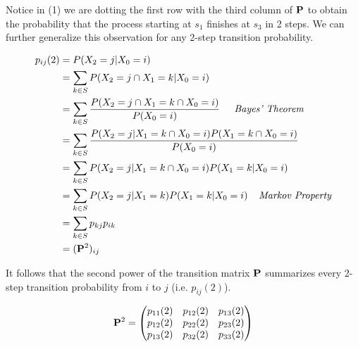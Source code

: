 \documentclass[a4paper,12pt]{article}
\theoremstyle{definition}
\let\oldtextbf\mathbf
\renewcommand{\mathbf}[1]{\oldtextbf{\boldmath #1}}
\begin{document}
	Notice in (1) we are dotting the first row with the third column of $\mathbf{P}$ to obtain the probability 
	that the process starting at $s_1$ finishes at $s_3$ in 2 steps. We can further generalize this observation for any 2-step 
	transition probability.

	\begin{equation*}
		\begin{aligned}
			p_{ij}(2) &= P(X_{2} = j | X_0 = i) \\
					&= \sum_{k \in S} P(X_{2} = j \cap X_1 = k | X_0 = i) \\
					&= \sum_{k \in S} \frac{P(X_{2} = j \cap X_1 = k \cap X_0 = i)}{P(X_0 = i)}\ \;\;\;\; \emph{Bayes' Theorem} \\
					&= \sum_{k \in S} \frac{P(X_{2} = j | X_1 = k \cap X_0 = i)P(X_1 = k \cap X_0 = i)}{P(X_0 = i)}\ \\
					&= \sum_{k \in S} P(X_{2} = j | X_1 = k \cap X_0 = i)P(X_1 = k | X_0 = i) \\
					&= \sum_{k \in S} P(X_{2} = j | X_1 = k)P(X_1 = k | X_0 = i) \;\;\;\; \emph{Markov Property} \\ 
					&= \sum_{k \in S} p_{kj}p_{ik} \\
					&= (\mathbf{P}^2)_{ij} \\
		\end{aligned}
	\end{equation*}	    

	It follows that the second power of the transition matrix $\mathbf{P}$ summarizes every 2-step transition probability 
	from $i$ to $j$ (i.e. $p_{ij}(2)$).

	\begin{equation*}
		\begin{aligned}
			\mathbf{P}^2 =
			\begin{pmatrix}
				p_{11}(2) & p_{12}(2) & p_{13}(2) \\
				p_{12}(2) & p_{22}(2) & p_{23}(2) \\
				p_{13}(2) & p_{32}(2) & p_{33}(2) \\
			\end{pmatrix}
		\end{aligned}
	\end{equation*}
\end{document}
